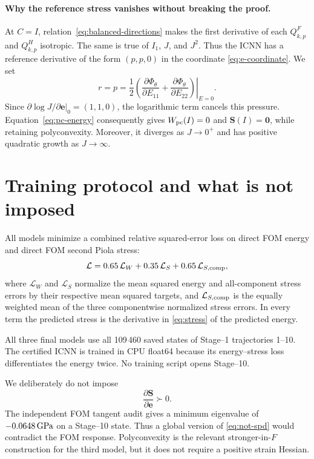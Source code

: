 \documentclass[10pt,a4paper]{article}
\begin{document}
\paragraph{Why the reference stress vanishes without breaking the proof.}
At $C=I$, relation~\eqref{eq:balanced-directions} makes the first derivative
of each $Q_{k,p}^F$ and $Q_{k,p}^H$ isotropic.  The same is true of $I_1$, $J$, and
$J^2$.  Thus the ICNN has a reference derivative of the form $(p,p,0)$ in
the coordinate \eqref{eq:e-coordinate}.  We set
\begin{equation}
 r=p=\frac12\left.
 \left(\frac{\partial\Phi_\theta}{\partial E_{11}}+
       \frac{\partial\Phi_\theta}{\partial E_{22}}\right)\right|_{E=0}.
 \label{eq:pressure-cancellation}
\end{equation}
Since $\partial\log J/\partial\bm e|_{0}=(1,1,0)$, the logarithmic term
cancels this pressure.  Equation~\eqref{eq:pc-energy} consequently gives
$W_{\rm pc}(I)=0$ and $\bm S(I)=\bm0$, while retaining polyconvexity.
Moreover, it diverges as $J\to0^+$ and has positive quadratic growth as
$J\to\infty$.

\section{Training protocol and what is not imposed}
\label{sec:training}
All models minimize a combined relative squared-error loss on direct FOM
energy and direct FOM second Piola stress:
\begin{equation}
 \mathcal L=0.65\,\mathcal L_W+0.35\,\mathcal L_S+0.65\,\mathcal L_{S,\rm comp},
 \label{eq:loss}
\end{equation}
where $\mathcal L_W$ and $\mathcal L_S$ normalize the mean squared energy and
all-component stress errors by their respective mean squared targets, and
$\mathcal L_{S,\rm comp}$ is the equally weighted mean of the three
componentwise normalized stress errors.  In every term the predicted stress
is the derivative in \eqref{eq:stress} of the predicted energy.

All three final models use all 109\,460 saved states of Stage--1 trajectories
1--10.  The certified ICNN is trained in CPU float64 because its
energy--stress loss differentiates the energy twice.  No training script opens
Stage--10.

We deliberately do not impose
\begin{equation}
 \frac{\partial\bm S}{\partial\bm e}\succ0.
 \label{eq:not-spd}
\end{equation}
The independent FOM tangent audit gives a minimum eigenvalue of
$-0.0648\,\mathrm{GPa}$ on a Stage--10 state.  Thus a global version of
\eqref{eq:not-spd} would contradict the FOM response.  Polyconvexity is the
relevant stronger-in-$F$ construction for the third model, but it does not
require a positive strain Hessian.
\end{document}
